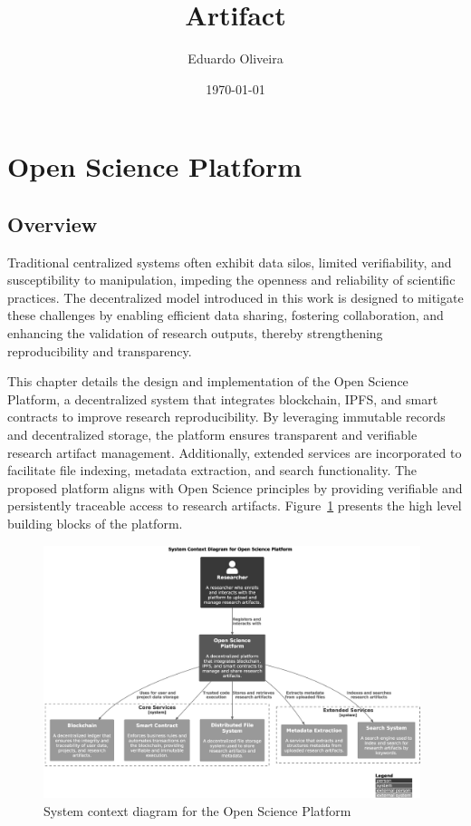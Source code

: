 \documentclass{article}
\title{Artifact}
\author{Eduardo Oliveira}
\date{\today}
\begin{document}
\maketitle

\section{Open Science Platform}

\subsection{Overview}

Traditional centralized systems often exhibit data silos, limited verifiability, and susceptibility to manipulation, impeding the openness and reliability of scientific practices. The decentralized model introduced in this work is designed to mitigate these challenges by enabling efficient data sharing, fostering collaboration, and enhancing the validation of research outputs, thereby strengthening reproducibility and transparency.

This chapter details the design and implementation of the Open Science Platform, a decentralized system that integrates blockchain, IPFS, and smart contracts to improve research reproducibility. By leveraging immutable records and decentralized storage, the platform ensures transparent and verifiable research artifact management. Additionally, extended services are incorporated to facilitate file indexing, metadata extraction, and search functionality. The proposed platform aligns with Open Science principles by providing verifiable and persistently traceable access to research artifacts. Figure~\ref{fig:c4_context_diagram} presents the high level building blocks of the platform.



\begin{figure}[htbp]
      \centering
      \includegraphics[width=0.98\textwidth, keepaspectratio]{c4_context_diagram.eps}
      \caption{System context diagram for the Open Science Platform}
      \label{fig:c4_context_diagram}
\end{figure}
\end{document}
